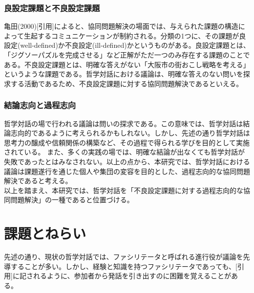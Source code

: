 \documentclass[11pt, a4paper]{jreport} %
\begin{document}
\subsubsection{良設定課題と不良設定課題}
亀田(2000)[引用]によると、協同問題解決の場面では、与えられた課題の構造によって生起するコミュニケーションが制約される。分類の1つに、その課題が良設定(well-defined)か不良設定(ill-defined)かというものがある。良設定課題とは、「ジグソーパズルを完成させる」など正解がただ一つのみ存在する課題のことである。不良設定課題とは、明確な答えがない「大阪市の街おこし戦略を考える」というような課題である。哲学対話における議論は、明確な答えのない問いを探求する活動であるため、不良設定課題に対する協同問題解決であるといえる。

\subsubsection{結論志向と過程志向}
哲学対話の場で行われる議論は問いの探求である。この意味では、哲学対話は結論志向的であるように考えられるかもしれない。しかし、先述の通り哲学対話は思考力の醸成や信頼関係の構築など、その過程で得られる学びを目的として実施されている。
また、多くの実践の場では、明確な結論が出なくても哲学対話が失敗であったとはみなされない。以上の点から、本研究では、哲学対話における議論は課題遂行を通じた個人や集団の変容を目的とした、過程志向的な協同問題解決であると考える。\\


以上を踏まえ、本研究では、哲学対話を「不良設定課題に対する過程志向的な協同問題解決」の一種であると位置づける。%



\section{課題とねらい}



先述の通り、現状の哲学対話では、ファシリテータと呼ばれる進行役が議論を先導することが多い。しかし、経験と知識を持つファシリテータであっても、[引用]に記されるように、参加者から発話を引き出すのに困難を覚えることがある。
\end{document}
